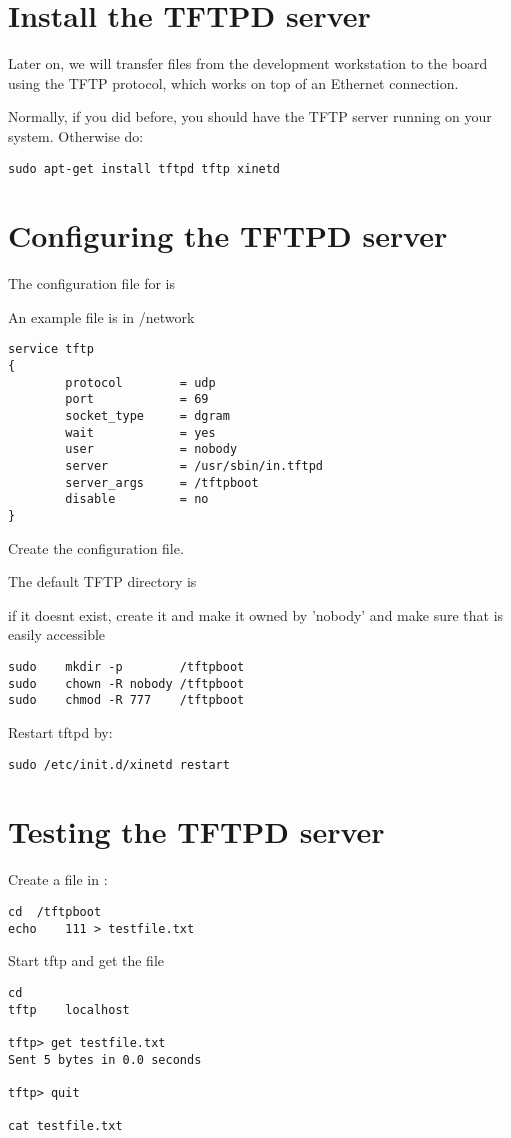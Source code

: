 
\section{Install the TFTPD server}

Later on, we will transfer files from the development workstation to
the board using the TFTP protocol, which works on top of an Ethernet
connection.

Normally, if you did  before, you should have
the TFTP server running on your system. Otherwise do:

\begin{verbatim}
sudo apt-get install tftpd tftp xinetd
\end{verbatim}

\section{Configuring the TFTPD server}

The configuration file for  is 

An example  file is in \labdir /network
\begin{verbatim}
service tftp
{
        protocol        = udp
        port            = 69
        socket_type     = dgram
        wait            = yes
        user            = nobody
        server          = /usr/sbin/in.tftpd
        server_args     = /tftpboot
        disable         = no
}
\end{verbatim}

Create the configuration file.

The default TFTP directory is 

if it doesnt exist, create it and make it owned by 'nobody'
and make sure that   is easily accessible


\begin{verbatim}
sudo    mkdir -p        /tftpboot
sudo    chown -R nobody /tftpboot
sudo    chmod -R 777    /tftpboot
\end{verbatim}

Restart tftpd by:

\begin{verbatim}
sudo /etc/init.d/xinetd restart
\end{verbatim}

\clearpage
\section{Testing the TFTPD server}

Create a file in :

\begin{verbatim}
cd	/tftpboot
echo	111	> testfile.txt
\end{verbatim}

Start tftp and get the file

\begin{verbatim}
cd
tftp	localhost

tftp> get testfile.txt
Sent 5 bytes in 0.0 seconds

tftp> quit

cat testfile.txt

\end{verbatim}


